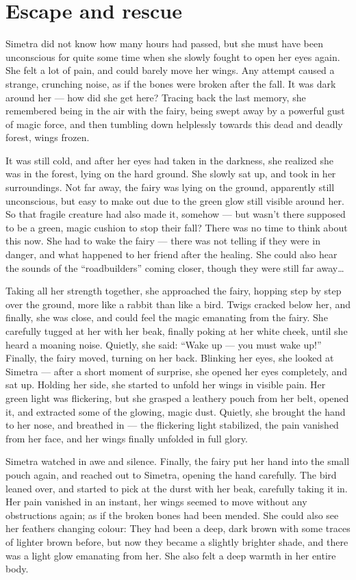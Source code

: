 \chapter{Escape and rescue}
\label{cha:escape-rescue}
Simetra did not know how many hours had passed, but she must have been unconscious for quite some time when she slowly fought to open her eyes again.
She felt a lot of pain, and could barely move her wings. Any attempt caused a strange, crunching noise, as if the bones were broken after the fall. It was dark around her --- how did she get here? Tracing back the last memory, she remembered being in the air with the fairy, being swept away by a powerful gust of magic force, and then tumbling down helplessly towards this dead and deadly forest, wings frozen.

It was still cold, and after her eyes had taken in the darkness, she realized she was in the forest, lying on the hard ground. She slowly sat up, and took in her surroundings. Not far away, the fairy was lying on the ground, apparently still unconscious, but easy to make out due to the green glow still visible around her. So that fragile creature had also made it, somehow --- but wasn't there supposed to be a green, magic cushion to stop their fall?
There was no time to think about this now. She had to wake the fairy --- there was not telling if they were in danger, and what happened to her friend after the healing. She could also hear the sounds of the \enquote{roadbuilders} coming closer, though they were still far away\dots{}

Taking all her strength together, she approached the fairy, hopping step by step over the ground, more like a rabbit than like a bird. Twigs cracked below her, and finally, she was close, and could feel the magic emanating from the fairy. She carefully tugged at her with her beak, finally poking at her white cheek, until she heard a moaning noise. Quietly, she said: \enquote{Wake up --- you must wake up!} Finally, the fairy moved, turning on her back. Blinking her eyes, she looked at Simetra --- after a short moment of surprise, she opened her eyes completely, and sat up. Holding her side, she started to unfold her wings in visible pain. Her green light was flickering, but she grasped a leathery pouch from her belt, opened it, and extracted some of the glowing, magic dust. Quietly, she brought the hand to her nose, and breathed in --- the flickering light stabilized, the pain vanished from her face, and her wings finally unfolded in full glory.

Simetra watched in awe and silence. Finally, the fairy put her hand into the small pouch again, and reached out to Simetra, opening the hand carefully. The bird leaned over, and started to pick at the durst with her beak, carefully taking it in. Her pain vanished in an instant, her wings seemed to move without any obstructions again; as if the broken bones had been mended. She could also see her feathers changing colour: They had been a deep, dark brown with some traces of lighter brown before, but now they became a slightly brighter shade, and there was a light glow emanating from her. She also felt a deep warmth in her entire body.


